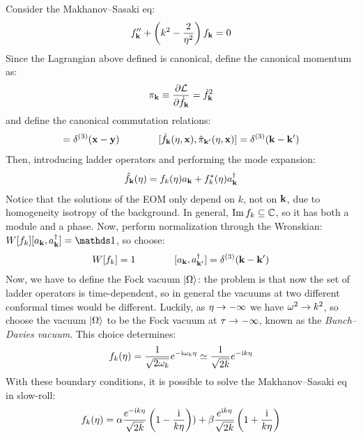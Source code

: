 Consider the Makhanov--Sasaki eq:
\begin{equation*}
  f_{\mathbf{k}}'' + \left( k^2 - \frac{2}{\eta^2} \right) f_{\mathbf{k}} = 0
\end{equation*}
Since the Lagrangian above defined is canonical, define the canonical momentum as:
\begin{equation*}
  \pi_{\mathbf{k}} \equiv \frac{\partial \mathcal{L}}{\partial \dot{f}_{\mathbf{k}}} = \dot{f}_{\mathbf{k}}^2
\end{equation*}
and define the canonical commutation relations:
\begin{equation*}
  [\hat{f}(\eta , \ve{x}) , \hat{\pi}(\eta , \ve{y})] = \delta^{(3)}(\ve{x} - \ve{y})
  \qquad \qquad
  [\hat{f}_\ve{k}(\eta , \ve{x}) , \hat{\pi}_{\ve{k}'}(\eta , \ve{x})] = \delta^{(3)}(\ve{k} - \ve{k}')
\end{equation*}
Then, introducing ladder operators and performing the mode expansion:
\begin{equation*}
  \hat{f}_{\mathbf{k}}(\eta) = f_k(\eta) a_{\mathbf{k}} + f_k^*(\eta) a_{\mathbf{k}}^\dagger
\end{equation*}
Notice that the solutions of the EOM only depend on $ k $, not on $ \mathbf{k} $, due to homogeneity isotropy of the background. In general, $ \operatorname{Im} f_k \subseteq \mathbb{C} $, so it has both a module and a phase. Now, perform normalization through the Wronskian: $ W[f_k] [a_\ve{k} , a_\ve{k}\dg] = \id $, so choose:
\begin{equation*}
  W[f_k] = 1
  \qquad \qquad
  [a_{\mathbf{k}} , a_{\mathbf{k'}}^\dagger] = \delta^{(3)}(\mathbf{k} - \mathbf{k}')
\end{equation*}
Now, we have to define the Fock vacuum $ \ket{\Omega}$: the problem is that now the set of ladder operators is time-dependent, so in general the vacuums at two different conformal times would be different. Luckily, as $ \eta \rightarrow - \infty $ we have $ \omega^2 \rightarrow k^2 $, so choose the vacuum $ \ket{\Omega} $ to be the Fock vacuum at $ \tau \rightarrow - \infty $, known as the \emph{Bunch--Davies vacuum}. This choice determines:
\begin{equation*}
  f_k(\eta) = \frac{1}{\sqrt{2\omega_k}} e^{-\mathrm{i} \omega_k \eta} \simeq \frac{1}{\sqrt{2k}} e^{-\mathrm{i} k \eta}
\end{equation*}
With these boundary conditions, it is possible to solve the Makhanov--Sasaki eq in slow-roll:
\begin{equation}
  f_k(\eta) = \alpha \frac{e^{-\mathrm{i} k \eta}}{\sqrt{2k}} \left( 1 - \frac{\mathrm{i}}{k \eta} \right)) + \beta \frac{e^{\mathrm{i} k \eta}}{\sqrt{2k}} \left( 1 + \frac{\mathrm{i}}{k \eta} \right)
\end{equation}
